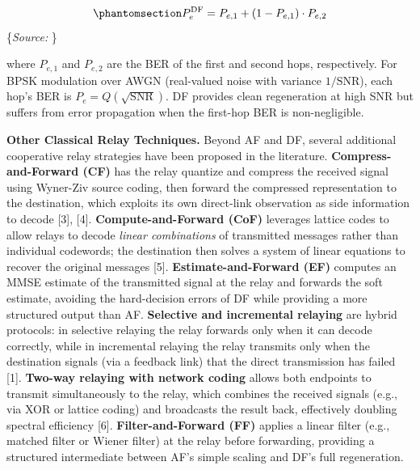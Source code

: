 \documentclass[
  english,
  12pt,
  12pt,
  a4paper,
  oneside]{report}
\begin{document}
\begin{equation}\protect\phantomsection\label{eq:df-ber-hops}{P_e^{\text{DF}} = P_{e,1} + (1 - P_{e,1}) \cdot P_{e,2}
}\end{equation} \footnotesize\{\textit{Source: \1}\}\normalsize

where \(P_{e,1}\) and \(P_{e,2}\) are the BER of the first and second hops, respectively. For BPSK modulation over AWGN (real-valued noise with variance \(1/\text{SNR}\)), each hop's BER is \(P_e = Q\left(\sqrt{\text{SNR}}\right)\). DF provides clean regeneration at high SNR but suffers from error propagation when the first-hop BER is non-negligible.

\textbf{Other Classical Relay Techniques.} Beyond AF and DF, several additional cooperative relay strategies have been proposed in the literature. \textbf{Compress-and-Forward (CF)} has the relay quantize and compress the received signal using Wyner-Ziv source coding, then forward the compressed representation to the destination, which exploits its own direct-link observation as side information to decode {[}3{]}, {[}4{]}. \textbf{Compute-and-Forward (CoF)} leverages lattice codes to allow relays to decode \emph{linear combinations} of transmitted messages rather than individual codewords; the destination then solves a system of linear equations to recover the original messages {[}5{]}. \textbf{Estimate-and-Forward (EF)} computes an MMSE estimate of the transmitted signal at the relay and forwards the soft estimate, avoiding the hard-decision errors of DF while providing a more structured output than AF. \textbf{Selective and incremental relaying} are hybrid protocols: in selective relaying the relay forwards only when it can decode correctly, while in incremental relaying the relay transmits only when the destination signals (via a feedback link) that the direct transmission has failed {[}1{]}. \textbf{Two-way relaying with network coding} allows both endpoints to transmit simultaneously to the relay, which combines the received signals (e.g., via XOR or lattice coding) and broadcasts the result back, effectively doubling spectral efficiency {[}6{]}. \textbf{Filter-and-Forward (FF)} applies a linear filter (e.g., matched filter or Wiener filter) at the relay before forwarding, providing a structured intermediate between AF's simple scaling and DF's full regeneration.
\end{document}
